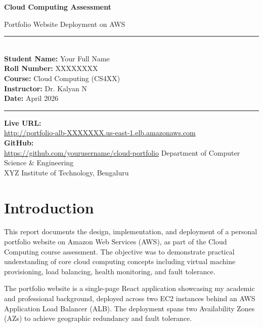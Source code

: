 \documentclass[12pt,a4paper]{article}
\begin{document}
\begin{titlepage}
  \centering
  \vspace*{2cm}
  {\Huge\bfseries Cloud Computing Assessment\par}
  \vspace{0.5cm}
  {\Large Portfolio Website Deployment on AWS\par}
  \vspace{2cm}
  \rule{\linewidth}{0.4pt}\\[0.5cm]
  {\large
    \textbf{Student Name:} Your Full Name\\[0.3cm]
    \textbf{Roll Number:} XXXXXXXX\\[0.3cm]
    \textbf{Course:} Cloud Computing (CS4XX)\\[0.3cm]
    \textbf{Instructor:} Dr. Kalyan N\\[0.3cm]
    \textbf{Date:} April 2026\\[0.3cm]
  }
  \rule{\linewidth}{0.4pt}
  \vspace{1cm}
  {\large\textbf{Live URL:}\\
  \url{http://portfolio-alb-XXXXXXX.us-east-1.elb.amazonaws.com}\\[0.5cm]}
  {\large\textbf{GitHub:}\\
  \url{https://github.com/yourusername/cloud-portfolio}}
  \vfill
  {\small Department of Computer Science \& Engineering\\
  XYZ Institute of Technology, Bengaluru}
\end{titlepage}

\tableofcontents
\newpage

\section{Introduction}

This report documents the design, implementation, and deployment of a personal portfolio website on Amazon Web Services (AWS), as part of the Cloud Computing course assessment. The objective was to demonstrate practical understanding of core cloud computing concepts including virtual machine provisioning, load balancing, health monitoring, and fault tolerance.

The portfolio website is a single-page React application showcasing my academic and professional background, deployed across two EC2 instances behind an AWS Application Load Balancer (ALB). The deployment spans two Availability Zones (AZs) to achieve geographic redundancy and fault tolerance.
\end{document}

